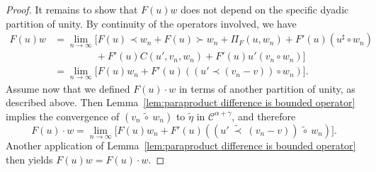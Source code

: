 \documentclass[11pt,a4paper]{article}
\theoremstyle{remark}
\newcommand{\CC}{\ensuremath{\mathscr{C}}}
\begin{document}
\begin{proof}
  It remains to show that $F(u) w$ does not depend on the specific dyadic partition of unity. By continuity of the operators involved, we have
  \begin{align*}
     F(u) w & = \lim_{n \to \infty} \Big[ F ( u ) \prec w_n + F ( u ) \succ w_n + \Pi_{F} ( u,w_n ) +F' ( u ) (u^\sharp \circ w_n) \\
     &\hspace{50pt} +F'(u) C(u', v_n, w_n) + F'(u) u' (v_n \circ w_n) \Big] \\
     & = \lim_{n \to \infty} \Big[ F(u) w_n + F'(u) ((u' \prec (v_n - v)) \circ w_n) \Big].
  \end{align*}
  Assume now that we defined $F(u) \cdot w$ in terms of another partition of unity, as described above. Then Lemma~\ref{lem:paraproduct difference is bounded operator} implies the convergence of $(v_n \ \widetilde \circ \ w_n)$ to $\tilde \eta$ in $\CC^{\alpha+\gamma}$, and therefore
  \[
     F(u) \cdot w = \lim_{n \to \infty} \Big[ F(u) w_n + F'(u) ((u' \ \widetilde \prec \ (v_n - v)) \ \widetilde \circ \ w_n) \Big].
  \]
  Another application of Lemma~\ref{lem:paraproduct difference is bounded operator} then yields $F(u) w = F(u) \cdot w$.
%  
%  
%  
%  
%  
%  
%  
%  

\end{proof}
\end{document}
